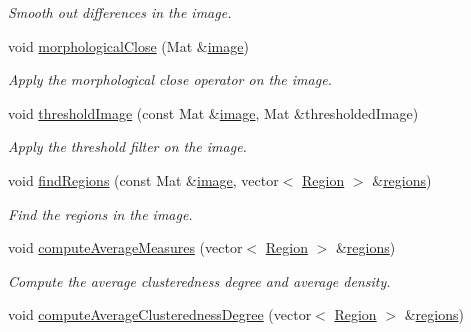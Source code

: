 \begin{DoxyCompactItemize}
\begin{DoxyCompactList}\small\item\em Smooth out differences in the image. \end{DoxyCompactList}\item 
void \hyperlink{classmultiscale_1_1analysis_1_1RegionDetector_adcb8ab3ced63de9168734f0b24072705}{morphological\-Close} (Mat \&\hyperlink{classmultiscale_1_1analysis_1_1Detector_a523830a6cfe409694ce8327c3c736fbd}{image})
\begin{DoxyCompactList}\small\item\em Apply the morphological close operator on the image. \end{DoxyCompactList}\item 
void \hyperlink{classmultiscale_1_1analysis_1_1RegionDetector_a614cd80fac5d3df2a25c401bb221149c}{threshold\-Image} (const Mat \&\hyperlink{classmultiscale_1_1analysis_1_1Detector_a523830a6cfe409694ce8327c3c736fbd}{image}, Mat \&thresholded\-Image)
\begin{DoxyCompactList}\small\item\em Apply the threshold filter on the image. \end{DoxyCompactList}\item 
void \hyperlink{classmultiscale_1_1analysis_1_1RegionDetector_a886ec5ee1cd2fd816c1cfd4e2ea6778e}{find\-Regions} (const Mat \&\hyperlink{classmultiscale_1_1analysis_1_1Detector_a523830a6cfe409694ce8327c3c736fbd}{image}, vector$<$ \hyperlink{classmultiscale_1_1analysis_1_1Region}{Region} $>$ \&\hyperlink{classmultiscale_1_1analysis_1_1RegionDetector_aa6517ceb3a58295448d32e6e41499893}{regions})
\begin{DoxyCompactList}\small\item\em Find the regions in the image. \end{DoxyCompactList}\item 
void \hyperlink{classmultiscale_1_1analysis_1_1RegionDetector_aee096ec729a12b62fd0c61f74601aad1}{compute\-Average\-Measures} (vector$<$ \hyperlink{classmultiscale_1_1analysis_1_1Region}{Region} $>$ \&\hyperlink{classmultiscale_1_1analysis_1_1RegionDetector_aa6517ceb3a58295448d32e6e41499893}{regions})
\begin{DoxyCompactList}\small\item\em Compute the average clusteredness degree and average density. \end{DoxyCompactList}\item 
void \hyperlink{classmultiscale_1_1analysis_1_1RegionDetector_a5ad71a8af2beb1a02573d0c125af4e16}{compute\-Average\-Clusteredness\-Degree} (vector$<$ \hyperlink{classmultiscale_1_1analysis_1_1Region}{Region} $>$ \&\hyperlink{classmultiscale_1_1analysis_1_1RegionDetector_aa6517ceb3a58295448d32e6e41499893}{regions})

\end{DoxyCompactItemize}
